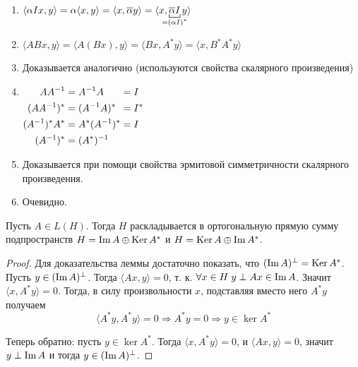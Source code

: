 \begin{proofbreak}
    \begin{enumerate}
        \item $
                \langle \alpha I x, y \rangle = \alpha \langle x, y\rangle =
                \langle x, \overline{\alpha} y \rangle = \langle x,
                \underbracket[0.5pt]{\overline{\alpha} I}_{\mathclap{=(\alpha I)^*}} y\rangle    
                $
        \item $ \langle ABx, y \rangle = \langle A(Bx), y\rangle = \langle
            Bx, A^*y\rangle = \langle x, B^*A^*y\rangle $
        \item Доказывается аналогично (используются свойства скалярного
            произведения)
        \item $
            \begin{alignedat}[t]{2}
                AA^{-1} &= A^{-1}A &&= I \\
                (AA^{-1})^* &= (A^{-1}A)^* &&= I^* \\
                (A^{-1})^* A^* &= A^* (A^{-1})^* &&= I \\
                (A^{-1})^* &= (A^*)^{-1}
            \end{alignedat}
            $
        \item Доказывается при помощи свойства эрмитовой симметричности скалярного
            произведения.
        \item Очевидно.
    \end{enumerate}
\end{proofbreak}

\begin{lemma}\label{lemma:orthogonaladjoint}
    Пусть $A \in L(H)$. Тогда $H$ раскладывается в ортогональную прямую сумму
    подпространств $H = \operatorname{Im} A \oplus \operatorname{Ker} A^*$ и $H = \operatorname{Ker} A \oplus \operatorname{Im} A^*$.
\end{lemma}

\begin{proof}
    Для доказательства леммы достаточно показать, что $(\operatorname{Im} A)^\perp = \operatorname{Ker}
    A^*$. Пусть $y \in (\operatorname{Im} A)^\perp$. Тогда $\langle Ax, y\rangle = 0$, т. к.
    $\forall x \in H \; y \perp Ax \in \operatorname{Im} A$. Значит $\langle x, A^*y\rangle =
    0$. Тогда, в силу произвольности $x$, подставляя вместо него $A^* y$
    получаем
    \[ \langle A^* y, A^* y\rangle = 0 \Rightarrow A^* y = 0 \Rightarrow y \in
    \ker A^* \]

    Теперь обратно: пусть $y \in \ker A^*$. Тогда $\langle x, A^* y\rangle = 0$,
    и $\langle Ax, y\rangle = 0$, значит $y \perp \operatorname{Im} A$ и тогда $y \in (\operatorname{Im}
    A)^\perp$.
\end{proof}

